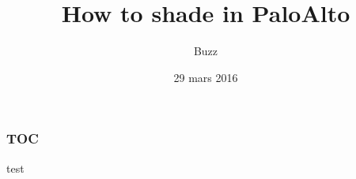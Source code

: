 \documentclass{beamer}
\title{How to shade in PaloAlto}
\author{Buzz}
\institute{TEST}
\date{29 mars 2016}
\begin{document}
\hspace*{-1.5cm}
\begin{frame}[plain]
\titlepage %
\end{frame}

\begin{frame}
\frametitle{TOC} 
test
\end{frame}
\end{document}
